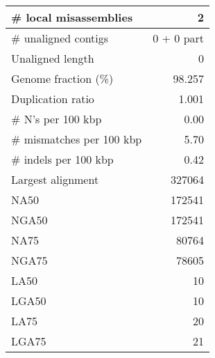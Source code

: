 \documentclass[12pt,a4paper]{article}
\begin{document}
\begin{table}[ht]
\begin{center}
\begin{tabular}{|l*{1}{|r}|}
\# local misassemblies & 2 \\ \hline
\# unaligned contigs & 0 + 0 part \\ \hline
Unaligned length & 0 \\ \hline
Genome fraction (\%) & 98.257 \\ \hline
Duplication ratio & 1.001 \\ \hline
\# N's per 100 kbp & 0.00 \\ \hline
\# mismatches per 100 kbp & 5.70 \\ \hline
\# indels per 100 kbp & 0.42 \\ \hline
Largest alignment & 327064 \\ \hline
NA50 & 172541 \\ \hline
NGA50 & 172541 \\ \hline
NA75 & 80764 \\ \hline
NGA75 & 78605 \\ \hline
LA50 & 10 \\ \hline
LGA50 & 10 \\ \hline
LA75 & 20 \\ \hline
LGA75 & 21 \\ \hline
\end{tabular}
\end{center}
\end{table}
\end{document}
